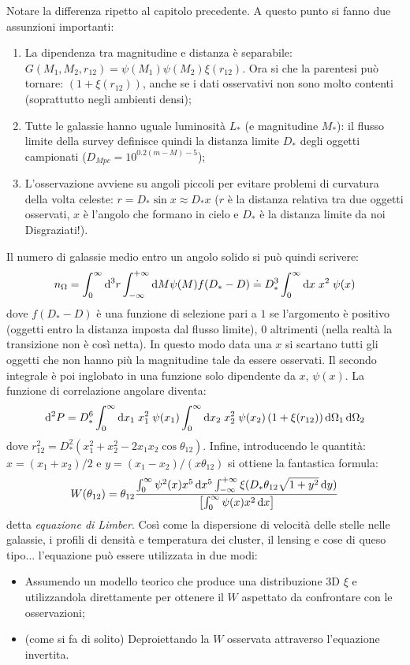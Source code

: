 Notare la differenza ripetto al capitolo precedente. A questo punto si fanno due assunzioni importanti:
\begin{enumerate}
    \item La dipendenza tra magnitudine e distanza è separabile: $G(M_1, M_2, r_{12})=\psi (M_1)\psi (M_2)\xi (r_{12})$. Ora si che la parentesi può tornare: $(1+\xi (r_{12}))$, anche se i dati osservativi non sono molto contenti (soprattutto negli ambienti densi);
    \item Tutte le galassie hanno uguale luminosità $L_*$ (e magnitudine $M_*$): il flusso limite della survey definisce quindi la distanza limite $D_*$ degli oggetti campionati ($D_{Mpc}=10^{0.2(m-M)-5}$);
    \item L'osservazione avviene su angoli piccoli per evitare problemi di curvatura della volta celeste: $r=D_*\sin x \approx D_* x$ ($r$ è la distanza relativa tra due oggetti osservati, $x$ è l'angolo che formano in cielo e $D_*$ è la distanza limite da noi Disgraziati!).
\end{enumerate}
Il numero di galassie medio entro un angolo solido si può quindi scrivere:
\begin{equation}
    n_\Omega = \int^\infty _0 \operatorname{d}\!{^3r}\int_{-\infty}^{+\infty}\operatorname{d}\!{M}\psi (M) f(D_*-D) \doteq D_*^3 \int_0^\infty \operatorname{d}\!{x}\; x^2 \; \psi(x)
\end{equation}
dove $f(D_*-D)$ è una funzione di selezione pari a $1$ se l'argomento è positivo (oggetti entro la distanza imposta dal flusso limite), $0$ altrimenti (nella realtà la transizione non è così netta). In questo modo data una $x$ si scartano tutti gli oggetti che non hanno più la magnitudine tale da essere osservati. Il secondo integrale è poi inglobato in una funzione solo dipendente da $x$, $\psi(x)$. La funzione di correlazione angolare diventa:
\begin{equation}
    \operatorname{d}\!{^2P}=D_*^6 \int_0^\infty \operatorname{d}\!{x_1}\; x_1^2 \; \psi(x_1) \int_0^\infty \operatorname{d}\!{x_2}\; x_2^2 \; \psi(x_2) \left(1+\xi(r_{12})\right)\operatorname{d}\!{\Omega_1}\operatorname{d}\!{\Omega_2}
\end{equation}
dove $r_{12}^2=D_*^2 (x_1^2+x_2^2-2x_1x_2\cos \theta_{12})$. Infine, introducendo le quantità: $x=(x_1+x_2)/2$ e $y=(x_1-x_2)/(x\theta_{12})$ si ottiene la fantastica formula:
\begin{equation}
    W(\theta_{12})=\theta_{12}\frac{\int_0^\infty \psi^2(x)x^5\operatorname{d}\!{x^5} \int_{-\infty}^{+\infty}\xi(D_*\theta_{12}\sqrt{1+y^2}\operatorname{d}\!{y})}{\left[\int_0^\infty \psi(x)x^2\operatorname{d}\!{x} \right]}
\end{equation}
detta \textit{equazione di Limber}. Così come la dispersione di velocità delle stelle nelle galassie, i profili di densità e temperatura dei cluster, il lensing e cose di queso tipo... l'equazione può essere utilizzata in due modi:
\begin{itemize}
    \item Assumendo un modello teorico che produce una distribuzione 3D $\xi$ e utilizzandola direttamente per ottenere il $W$ aspettato da confrontare con le osservazioni;
    \item (come si fa di solito) Deproiettando la $W$ osservata attraverso l'equazione invertita.
\end{itemize}


